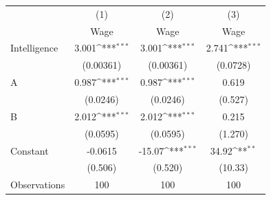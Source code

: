 {
\def\sym#1{\ifmmode^{#1}\else\(^{#1}\)\fi}
\begin{tabular}{l*{3}{c}}
\toprule
                    &\multicolumn{1}{c}{(1)}&\multicolumn{1}{c}{(2)}&\multicolumn{1}{c}{(3)}\\
                    &\multicolumn{1}{c}{Wage}&\multicolumn{1}{c}{Wage}&\multicolumn{1}{c}{Wage}\\
\midrule
Intelligence        &       3.001\sym{***}&       3.001\sym{***}&       2.741\sym{***}\\
                    &   (0.00361)         &   (0.00361)         &    (0.0728)         \\
\addlinespace
A                   &       0.987\sym{***}&       0.987\sym{***}&       0.619         \\
                    &    (0.0246)         &    (0.0246)         &     (0.527)         \\
\addlinespace
B                   &       2.012\sym{***}&       2.012\sym{***}&       0.215         \\
                    &    (0.0595)         &    (0.0595)         &     (1.270)         \\
\addlinespace
Constant            &     -0.0615         &      -15.07\sym{***}&       34.92\sym{**} \\
                    &     (0.506)         &     (0.520)         &     (10.33)         \\
\midrule
Observations        &         100         &         100         &         100         \\
\bottomrule
\end{tabular}
}
